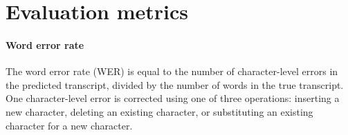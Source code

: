 \section{Evaluation metrics}

\paragraph*{Word error rate}
The word error rate (WER) is equal to the number of character-level errors in the predicted transcript, 
divided by the number of words in the true transcript. One character-level error is corrected using one of three operations:
inserting a new character, deleting an existing character, or substituting an existing character for a new character.